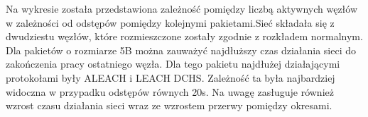%
%
%
%
\newpage
Na wykresie została przedstawiona zależność pomiędzy liczbą aktywnych węzłów w zależności od odstępów pomiędzy kolejnymi  pakietami.Sieć składała się z dwudziestu węzłów, które rozmieszczone zostały zgodnie z rozkładem normalnym.
Dla pakietów o rozmiarze 5B można zauważyć najdłuższy czas działania sieci do zakończenia pracy ostatniego węzła. Dla tego pakietu najdłużej działającymi protokołami były ALEACH i LEACH DCHS. Zależność ta była najbardziej widoczna w przypadku odstępów równych 20s. Na uwagę zasługuje również wzrost czasu działania sieci wraz ze wzrostem przerwy pomiędzy okresami.

